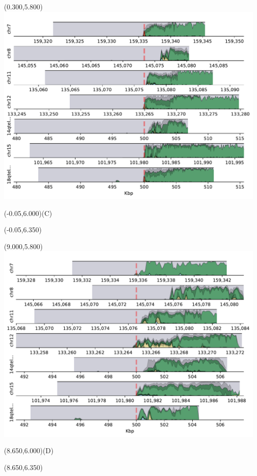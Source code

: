 \documentclass{article}
\begin{document}
\begin{textblock}{13}(0.300,5.800)\includegraphics{Figure_S3/HG004/densityplot-q_arm.pdf}\end{textblock}
\begin{textblock}{13}(-0.05,6.000)\LARGE{(C)}\end{textblock}
\begin{textblock}{13}(-0.05,6.350)\end{textblock}

\begin{textblock}{13}(9.000,5.800)\includegraphics{Figure_S3/HG005/densityplot-q_arm.pdf}\end{textblock}
\begin{textblock}{13}(8.650,6.000)\LARGE{(D)}\end{textblock}
\begin{textblock}{13}(8.650,6.350)\end{textblock}
\end{document}
